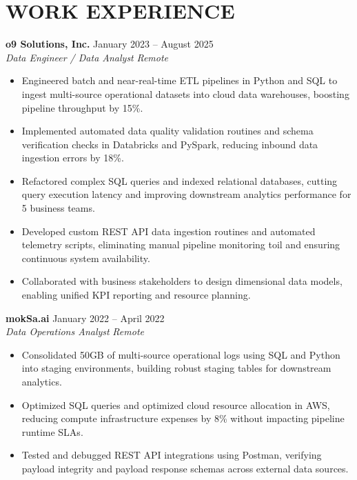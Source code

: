 \documentclass[11pt,letterpaper]{article}
\begin{document}
\section*{WORK EXPERIENCE}
\noindent\small \textbf{o9 Solutions, Inc.} \hfill January 2023 -- August 2025 \\
\textit{Data Engineer / Data Analyst} \hfill \textit{Remote}
\begin{itemize}
\item Engineered batch and near-real-time ETL pipelines in Python and SQL to ingest multi-source operational datasets into cloud data warehouses, boosting pipeline throughput by 15\%.
\item Implemented automated data quality validation routines and schema verification checks in Databricks and PySpark, reducing inbound data ingestion errors by 18\%.
\item Refactored complex SQL queries and indexed relational databases, cutting query execution latency and improving downstream analytics performance for 5 business teams.
\item Developed custom REST API data ingestion routines and automated telemetry scripts, eliminating manual pipeline monitoring toil and ensuring continuous system availability.
\item Collaborated with business stakeholders to design dimensional data models, enabling unified KPI reporting and resource planning.
\end{itemize}
\noindent\small \textbf{mokSa.ai} \hfill January 2022 -- April 2022 \\
\textit{Data Operations Analyst} \hfill \textit{Remote}
\begin{itemize}
\item Consolidated 50GB of multi-source operational logs using SQL and Python into staging environments, building robust staging tables for downstream analytics.
\item Optimized SQL queries and optimized cloud resource allocation in AWS, reducing compute infrastructure expenses by 8\% without impacting pipeline runtime SLAs.
\item Tested and debugged REST API integrations using Postman, verifying payload integrity and payload response schemas across external data sources.
\end{itemize}
\end{document}

